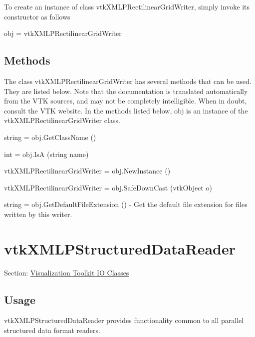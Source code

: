 To create an instance of class vtk\-X\-M\-L\-P\-Rectilinear\-Grid\-Writer, simply invoke its constructor as follows \begin{DoxyVerb}  obj = vtkXMLPRectilinearGridWriter
\end{DoxyVerb}
 \hypertarget{vtkwidgets_vtkxyplotwidget_Methods}{}\subsection{Methods}\label{vtkwidgets_vtkxyplotwidget_Methods}
The class vtk\-X\-M\-L\-P\-Rectilinear\-Grid\-Writer has several methods that can be used. They are listed below. Note that the documentation is translated automatically from the V\-T\-K sources, and may not be completely intelligible. When in doubt, consult the V\-T\-K website. In the methods listed below, {\ttfamily obj} is an instance of the vtk\-X\-M\-L\-P\-Rectilinear\-Grid\-Writer class. 
\begin{DoxyItemize}
\item {\ttfamily string = obj.\-Get\-Class\-Name ()}  
\item {\ttfamily int = obj.\-Is\-A (string name)}  
\item {\ttfamily vtk\-X\-M\-L\-P\-Rectilinear\-Grid\-Writer = obj.\-New\-Instance ()}  
\item {\ttfamily vtk\-X\-M\-L\-P\-Rectilinear\-Grid\-Writer = obj.\-Safe\-Down\-Cast (vtk\-Object o)}  
\item {\ttfamily string = obj.\-Get\-Default\-File\-Extension ()} -\/ Get the default file extension for files written by this writer.  
\end{DoxyItemize}\hypertarget{vtkio_vtkxmlpstructureddatareader}{}\section{vtk\-X\-M\-L\-P\-Structured\-Data\-Reader}\label{vtkio_vtkxmlpstructureddatareader}
Section\-: \hyperlink{sec_vtkio}{Visualization Toolkit I\-O Classes} \hypertarget{vtkwidgets_vtkxyplotwidget_Usage}{}\subsection{Usage}\label{vtkwidgets_vtkxyplotwidget_Usage}
vtk\-X\-M\-L\-P\-Structured\-Data\-Reader provides functionality common to all parallel structured data format readers.


